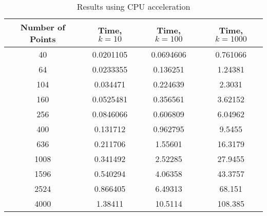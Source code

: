 \begin{table}[ht!]
    \centering
    {\footnotesize
        \begin{tabular}{| c | c c c |}
            \hline
            Number of Points & Time, $k=10$ &  Time, $k=100$ &   Time, $k=1000$ \\
            \hline
            40  &  0.0201105   &   0.0694606    &    0.761066 \\
            64  &  0.0233355   &   0.136251     &    1.24381 \\
            104  &  0.034471    &   0.224639     &    2.3031 \\
            160  &  0.0525481   &   0.356561     &    3.62152 \\
            256  &  0.0846066   &   0.606809     &    6.04962 \\
            400  &  0.131712    &   0.962795     &    9.5455 \\
            636  &  0.211706    &   1.55601      &   16.3179 \\
            1008  &  0.341492    &   2.52285      &   27.9455 \\
            1596  &  0.540294    &   4.06358      &   43.3757 \\
            2524  &  0.866405    &   6.49313      &   68.151 \\
            4000  &  1.38411     &  10.5114       &  108.385 \\
            \hline
        \end{tabular}
    }
    \caption{Results using CPU acceleration}
    \label{tb:cpu}
\end{table}

